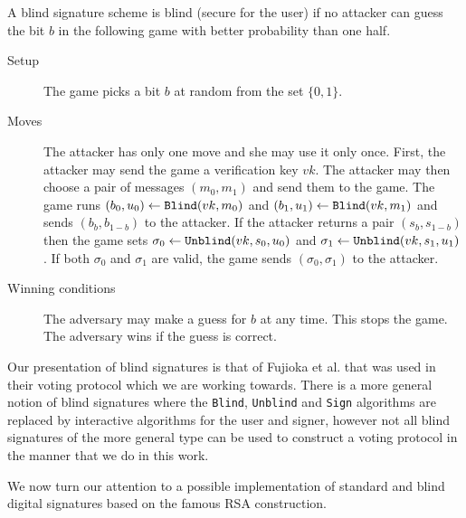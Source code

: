 \documentclass[envcountsame]{llncs}
\newcommand{\alg}[1]{\textup{\texttt{#1}}}
\begin{document}
\begin{definition}
A blind signature scheme is blind (secure for the user) if no attacker can guess
the bit $b$ in the following game with better probability than one half.

\begin{description}
\item[Setup]
The game picks a bit $b$ at random from the set $\{0, 1\}$.

\item[Moves]
The attacker has only one move and she may use it only once. First, the attacker
may send the game a verification key $vk$. The attacker may then choose a pair
of messages $(m_0, m_1)$ and send them to the game.
The game runs $(b_0, u_0) \gets \alg{Blind}(vk, m_0)$ and
$(b_1, u_1) \gets \alg{Blind}(vk, m_1)$ and sends $(b_b, b_{1-b})$ to the
attacker. If the attacker returns a pair $(s_b, s_{1-b})$ then the game sets
$\sigma_0 \gets \alg{Unblind}(vk, s_0, u_0)$ and
$\sigma_1 \gets \alg{Unblind}(vk, s_1, u_1)$. If both $\sigma_0$ and $\sigma_1$
are valid, the game sends $(\sigma_0, \sigma_1)$ to the attacker.

\item[Winning conditions]
The adversary may make a guess for $b$ at any time. This stops the game.
The adversary wins if the guess is correct.
\end{description}
\end{definition}

Our presentation of blind signatures is that of Fujioka et al. \cite{FOO92}
that was used in their voting protocol which we are working towards. There is a
more general notion of blind signatures where the \alg{Blind}, \alg{Unblind} and
\alg{Sign} algorithms are replaced by interactive algorithms for the user and
signer, however not all blind signatures of the more general type can be used
to construct a voting protocol in the manner that we do in this work.

We now turn our attention to a possible implementation of standard and blind
digital signatures based on the famous RSA construction.
\end{document}
